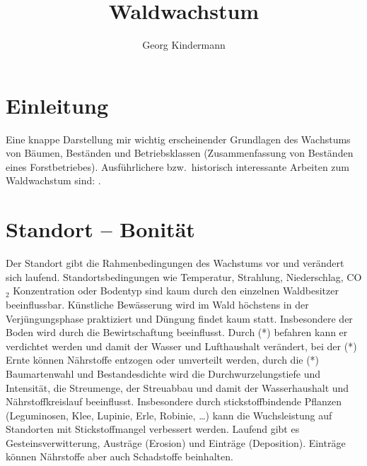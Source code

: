 \documentclass[twocolumn]{scrartcl}
\title{Waldwachstum}
\author{Georg Kindermann}
\begin{document}
\twocolumn[
  \begin{@twocolumnfalse}
    \maketitle
  \end{@twocolumnfalse}
]

\tableofcontents

\section{Einleitung}

Eine knappe Darstellung mir wichtig erscheinender Grundlagen des Wachstums von
Bäumen, Beständen und Betriebsklassen (Zusammenfassung von Beständen eines
Forstbetriebes). Ausführlichere bzw.\ historisch interessante Arbeiten zum
Waldwachstum sind:
\cite{guttenberg1885Wachstumsgesetze,guttenberg1912ZuwachslehreInHandbuchDerForstwissenschaft,vanselow1941Zuwachslehre,weck1948,wiedemann1951Ertragskunde,assmann1961Waldertraskunde,erteld1966Waldertragslehre,mitscherlich1975WaldWachstumUmwelt,kramer1988Waldwachstumslehre,wenk1990Waldertragslehre,pretzsch2002Grundlagen,Pretzsch2003Modellierung,Vanclay2006,Weiskittel2011,Pretzsch2019}.

\section{Standort -- Bonität}

Der Standort gibt die Rahmenbedingungen des Wachstums vor und verändert sich
laufend. Standortsbedingungen wie Temperatur, Strahlung, Niederschlag, CO$_2$
Konzentration oder Bodentyp sind kaum durch den einzelnen Waldbesitzer
beeinflussbar. Künstliche Bewässerung wird im Wald höchstens in der
Verjüngungsphase praktiziert und Düngung findet kaum statt. Insbesondere der
Boden wird durch die Bewirtschaftung beeinflusst. Durch (*) befahren kann er
verdichtet werden und damit der Wasser und Lufthaushalt verändert, bei der (*)
Ernte können Nährstoffe entzogen oder umverteilt werden, durch die (*)
Baumartenwahl und Bestandesdichte wird die Durchwurzelungstiefe und Intensität,
die Streumenge, der Streuabbau und damit der Wasserhaushalt und
Nährstoffkreislauf beeinflusst. Insbesondere durch stickstoffbindende Pflanzen
(Leguminosen, Klee, Lupinie, Erle, Robinie, \dots) kann die Wuchsleistung auf
Standorten mit Stickstoffmangel verbessert werden. Laufend gibt es
Gesteinsverwitterung, Austräge (Erosion) und Einträge (Deposition). Einträge
können Nährstoffe aber auch Schadstoffe beinhalten.
\end{document}
